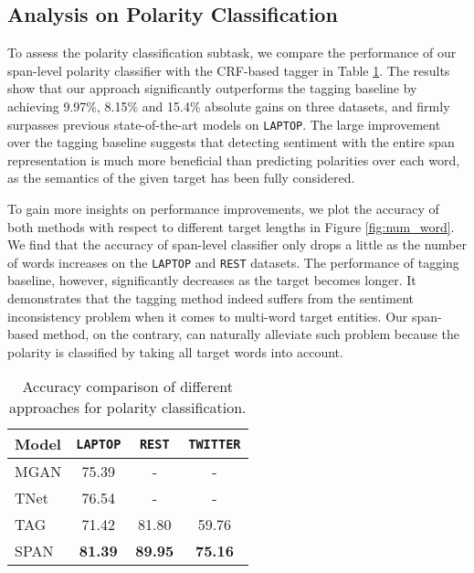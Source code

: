 \documentclass[11pt,a4paper]{article}
\begin{document}
\subsection{Analysis on Polarity Classification}
To assess the polarity classification subtask, we compare the performance of our span-level polarity classifier with the CRF-based tagger in Table \ref{table:polarity_classi}. 
The results show that our approach significantly outperforms the tagging baseline by achieving 9.97\%, 8.15\% and 15.4\% absolute gains on three datasets, and firmly surpasses previous state-of-the-art models on \texttt{LAPTOP}.
The large improvement over the tagging baseline suggests that detecting sentiment with the entire span representation is much more beneficial than predicting polarities over each word, as the semantics of the given target has been fully considered. 

To gain more insights on performance improvements, we plot the accuracy of both methods with respect to different target lengths in Figure \ref{fig:num_word}.
We find that the accuracy of span-level classifier only drops a little as the number of words increases on the \texttt{LAPTOP} and \texttt{REST} datasets.
The performance of tagging baseline, however, significantly decreases as the target becomes longer.
It demonstrates that the tagging method indeed suffers from the sentiment inconsistency problem when it comes to multi-word target entities.
Our span-based method, on the contrary, can naturally alleviate such problem because the polarity is classified by taking all target words into account.

\begin{table}
\begin{center}
\begin{tabular}{l|c|c|c}
\toprule
Model  & \texttt{LAPTOP}  & \texttt{REST} & \texttt{TWITTER} \\ 
\midrule
MGAN    & 75.39 & - & -  \\
TNet    & 76.54 & - & -  \\
TAG     & 71.42 & 81.80 & 59.76  \\
SPAN    & \textbf{81.39} & \textbf{89.95} & \textbf{75.16}  \\
\bottomrule
\end{tabular}
\caption{\label{table:polarity_classi} Accuracy comparison of different approaches for polarity classification.}
\end{center}
\end{table}
\end{document}
